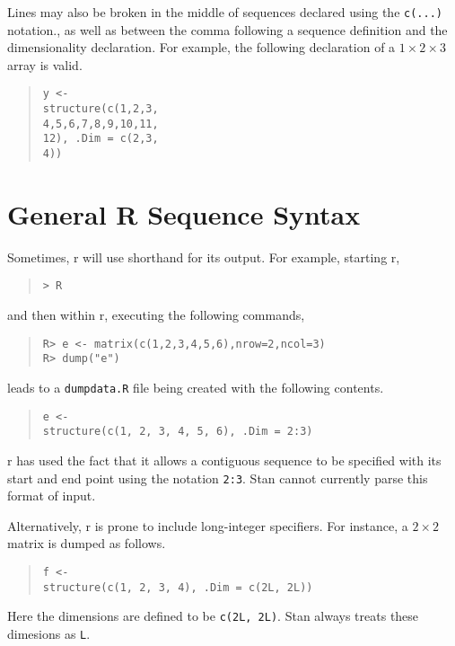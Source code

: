 \documentclass[10pt]{report}
\newcommand{\Stan}{Stan\xspace}
\newcommand{\acronym}[1]{{\sc #1}\xspace}
\newcommand{\R}{\acronym{r}}
\newcommand{\code}[1]{{\tt #1}}
\begin{document}
Lines may also be broken in the middle of sequences declared
using the \code{c(...)} notation., as well as between the comma
following a sequence definition and the dimensionality declaration.
For example, the following declaration of a $1 \times 2 \times 3$
array is valid.
%
\begin{quote}
\begin{Verbatim}
y <-
structure(c(1,2,3,
4,5,6,7,8,9,10,11,
12), .Dim = c(2,3,
4))
\end{Verbatim}
\end{quote}

\section{General R Sequence Syntax}

Sometimes, \R will use shorthand for its output. For example,
starting \R,

\begin{quote}
\begin{Verbatim}[fontshape=sl]
> R
\end{Verbatim}
\end{quote}
%
and then within \R, executing the following commands,

\begin{quote}
\begin{Verbatim}[fontshape=sl]
R> e <- matrix(c(1,2,3,4,5,6),nrow=2,ncol=3)
R> dump("e")
\end{Verbatim}
\end{quote}
%
leads to a \code{dumpdata.R} file being created with
the following contents.
%
\begin{quote}
\begin{Verbatim}
e <-
structure(c(1, 2, 3, 4, 5, 6), .Dim = 2:3)
\end{Verbatim}
\end{quote}
%
\R has used the fact that it allows a contiguous
sequence to be specified with its start and end point
using the notation \code{2:3}.  \Stan cannot currently
parse this format of input.  

Alternatively, \R is prone to include long-integer specifiers.
For instance, a $2 \times 2$ matrix is dumped as follows.
%
\begin{quote}
\begin{Verbatim}
f <-
structure(c(1, 2, 3, 4), .Dim = c(2L, 2L))
\end{Verbatim}
\end{quote}
%
Here the dimensions are defined to be \code{c(2L,~2L)}.  \Stan 
always treats these dimesions as \code{L}.
\end{document}
